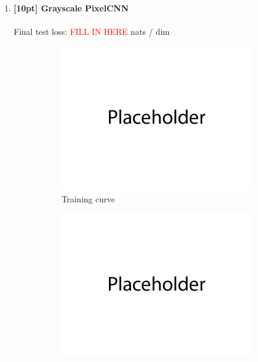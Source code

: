 \documentclass{article}
\begin{document}
\begin{enumerate}
\newpage
\item {\bf [10pt] Grayscale PixelCNN} \\\\
Final test loss: \textcolor{red}{FILL IN HERE}  nats / dim
\begin{figure}[H]
    \centering
    \begin{subfigure}{0.45\textwidth}
        \centering
        \includegraphics[width=\textwidth]{figures/q4_b_train_plot.png}
        \caption{Training curve}
    \end{subfigure}
    \hspace{0.2in}
    \begin{subfigure}{0.45\textwidth}
        \centering
        \includegraphics[width=\textwidth]{figures/q4_b_samples.png}

\end{subfigure}
\end{figure}
\end{enumerate}
\end{document}

